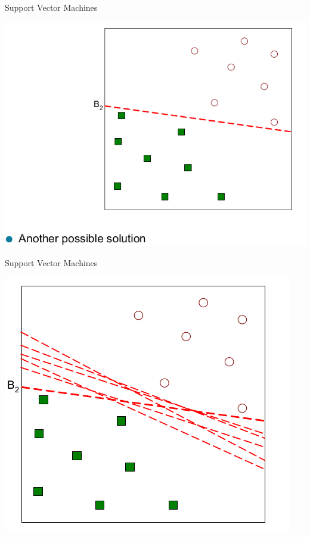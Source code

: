 \documentclass{beamer}
\begin{document}
\begin{frame}{Support Vector Machines}
    \begin{center}
        \includegraphics[scale=0.32]{svm3.png}
    \end{center}
\end{frame}
\begin{frame}{Support Vector Machines}
    \begin{center}
        \includegraphics[scale=0.32]{svm4.png}
    \end{center}
\end{frame}
\end{document}

